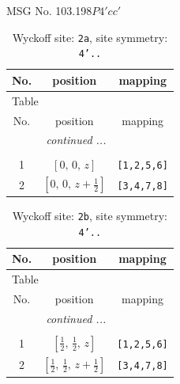 \documentclass[fleqn,8pt]{jsarticle}
\begin{document}
\setcounter{MaxMatrixCols}{32}

\renewcommand{\tablename}{Table~}
\renewcommand{\figurename}{Figure~}
\begin{center}
\LARGE
MSG No. 103.198\quad$P4'cc'$
\end{center}
\renewcommand{\arraystretch}{1.2}
\begin{longtable}{ccc}
\caption{Wyckoff site: {\tt 2a}, site symmetry: {\tt 4'..}}
 \\
 \hline \hline
No. & position & mapping \\ \hline \endfirsthead

\multicolumn{2}{l}{\tablename\ \thetable{}} \\
 \hline \hline
No. & position & mapping \\ \hline \endhead

 \hline \hline
\multicolumn{2}{r}{\footnotesize\it continued ...} \\ \endfoot

 \hline \hline
\multicolumn{2}{r}{} \\ \endlastfoot

1 & $\left[ 0,\, 0,\, z \right]$ & {\tt [1,2,5,6]} \\ \hline
2 & $\left[ 0,\, 0,\, z + \frac{1}{2} \right]$ & {\tt [3,4,7,8]} \\
\end{longtable}
\renewcommand{\arraystretch}{1.2}
\begin{longtable}{ccc}
\caption{Wyckoff site: {\tt 2b}, site symmetry: {\tt 4'..}}
 \\
 \hline \hline
No. & position & mapping \\ \hline \endfirsthead

\multicolumn{2}{l}{\tablename\ \thetable{}} \\
 \hline \hline
No. & position & mapping \\ \hline \endhead

 \hline \hline
\multicolumn{2}{r}{\footnotesize\it continued ...} \\ \endfoot

 \hline \hline
\multicolumn{2}{r}{} \\ \endlastfoot

1 & $\left[ \frac{1}{2},\, \frac{1}{2},\, z \right]$ & {\tt [1,2,5,6]} \\ \hline
2 & $\left[ \frac{1}{2},\, \frac{1}{2},\, z + \frac{1}{2} \right]$ & {\tt [3,4,7,8]} \\
\end{longtable}
\end{document}
